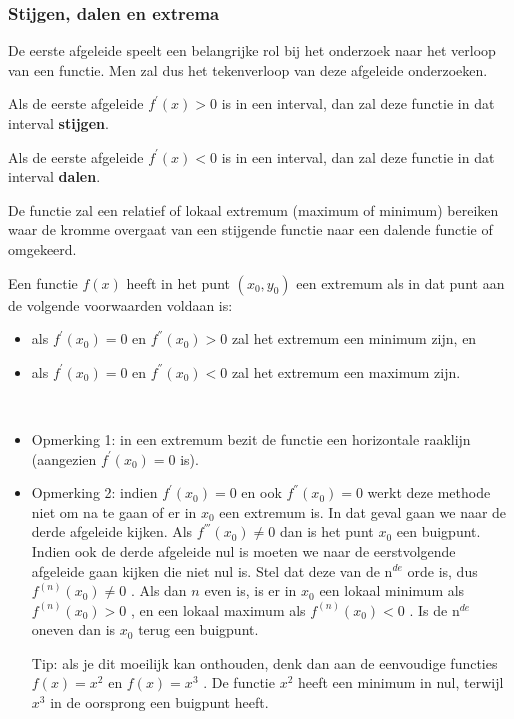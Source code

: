 \subsubsection{Stijgen, dalen en extrema}

De eerste afgeleide speelt een belangrijke rol bij het onderzoek
naar het verloop van een functie. Men zal dus het tekenverloop van
deze afgeleide onderzoeken.




\begin{definitie}
	Als de eerste afgeleide $f^{'}(x)>0$ is in een interval,
dan zal deze functie in dat interval \textbf{stijgen}.

Als de eerste afgeleide $f^{'}(x)<0$ is in een interval,
dan zal deze functie in dat interval \textbf{dalen}.

De functie zal een relatief of lokaal extremum (maximum
of minimum) bereiken waar de kromme overgaat van een stijgende functie
naar een dalende functie of omgekeerd.

Een functie $f(x)$ heeft in het punt $(x_{0},y_{0})$ een
extremum als in dat punt aan de volgende voorwaarden voldaan is:

\begin{itemize}
\item als $f^{'}(x_{0})=0$ en $f^{''}(x_{0})>0$ zal het
extremum een minimum zijn, en
\item als $f^{'}(x_{0})=0$ en $f^{''}(x_{0})<0$ zal het
extremum een maximum zijn.
\end{itemize}

\end{definitie}

\begin{opmerking}
	\ \\
	\begin{itemize}
\item Opmerking 1: in een extremum bezit de functie een horizontale
raaklijn (aangezien $f^{'}(x_{0})=0$ is).
\item Opmerking 2: indien $f^{'}(x_{0})=0$ en ook $f^{''}(x_{0})=0$
werkt deze methode niet om na te gaan of er in $x_{0}$ een extremum
is. In dat geval gaan we naar de derde afgeleide kijken. Als $f^{'''}(x_{0})\neq0$
dan is het punt $x_{0}$ een buigpunt. Indien ook de derde afgeleide
nul is moeten we naar de eerstvolgende afgeleide gaan kijken die niet
nul is. Stel dat deze van de n$^{de}$ orde is, dus $f^{(n)}(x_{0})\neq0$
. Als dan $n$ even is, is er in $x_{0}$ een lokaal minimum als $f^{(n)}(x_{0})>0$
, en een lokaal maximum als $f^{(n)}(x_{0})<0$ . Is de n$^{de}$
oneven dan is $x_{0}$ terug een buigpunt. 

Tip: als je dit moeilijk
kan onthouden, denk dan aan de eenvoudige functies $f(x)=x^{2}$ en
$f(x)=x^{3}$ . De functie $x^{2}$ heeft een minimum in nul, terwijl
$x^{3}$ in de oorsprong een buigpunt heeft.
\end{itemize}

\end{opmerking}



